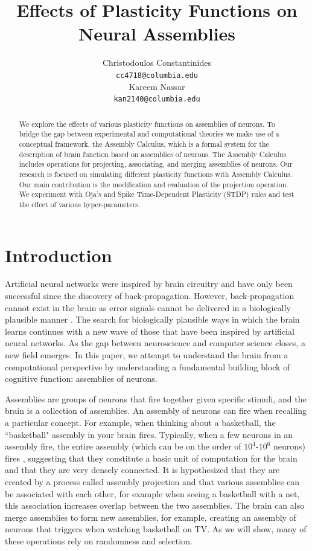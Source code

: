 \documentclass{article}
\title{Effects of Plasticity Functions on Neural Assemblies}
\author{
  Christodoulos Constantinides\\
  \texttt{cc4718@columbia.edu} \\
  \And 
    Kareem Nassar\\
  \texttt{kan2140@columbia.edu} \\
}
\begin{document}

\maketitle
\begin{abstract}
We explore the effects of various plasticity functions on assemblies of neurons. To bridge the gap between experimental and computational theories we make use of a conceptual framework, the Assembly Calculus, which is a formal system for the description of brain function based on assemblies of neurons.
The Assembly Calculus includes operations for projecting, associating, and merging assemblies of neurons. Our research is focused on simulating different plasticity functions with Assembly Calculus. Our main contribution is the modification and evaluation of the projection operation. We experiment with Oja’s and Spike Time-Dependent Plasticity (STDP) rules and test the effect of various hyper-parameters.
	
\end{abstract}


\section{Introduction}
Artificial neural networks were inspired by brain circuitry and have only been successful since the discovery of back-propagation. However, back-propagation cannot exist in the brain as error signals cannot be delivered in a biologically plausible manner \cite{backprop}. The search for biologically plausible ways in which the brain learns continues with a new wave of those that have been inspired by artificial neural networks. As the gap between neuroscience and computer science closes, a new field emerges. In this paper, we attempt to understand the brain from a computational perspective by understanding a fundamental building block of cognitive function: assemblies of neurons.

Assemblies are groups of neurons that fire together given specific stimuli, and the brain is a collection of assemblies. An assembly of neurons can fire when recalling a particular concept. For example, when thinking about a basketball, the ``basketball" assembly in your brain fires. Typically, when a few neurons in an assembly fire, the entire assembly (which can be on the order of $10^4$-$10^6$ neurons) fires \cite{ensemble_recall}, suggesting that they constitute a basic unit of computation for the brain and that they are very densely connected. It is hypothesized that they are created by a process called assembly projection \cite{Papadimitriou14464} and that various assemblies can be associated with each other, for example when seeing a basketball with a net, this association increases overlap between the two assemblies. The brain can also merge assemblies to form new assemblies, for example, creating an assembly of neurons that triggers when watching basketball on TV. As we will show, many of these operations rely on randomness and selection.
\end{document}
